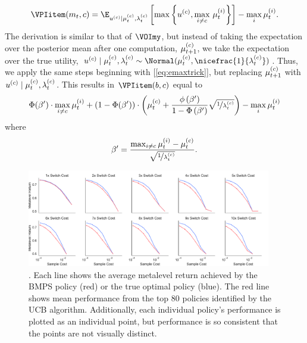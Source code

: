 \begin{equation*}
  \VPIitem(m_t,c)=\E_{u^{(c)} \mid \currentmean, \currentlam} \left[
    \max \left\{ u^{(c)},\max_{i\neq c}\,\mu_t^{(i)} \right\}
  \right] -\max_{i}\mu_t^{(i)}.
\end{equation*}
%
The derivation is similar to that of $\VOImy$, but instead of taking the expectation over the posterior mean after one computation, $\mu_{t+1}^{(c)}$, we take the expectation over the true utility, $u^{(c)} \mid \currentmean, \currentlam \sim \Normal(\currentmean,\nicefrac{1}{\currentlam})$. Thus, we apply the same steps beginning with [\ref{eq:emaxtrick}], but replacing $\mu_{t+1}^{(c)}$ with $u^{(c)} \mid \mu_{t}^{(c)}, \lambda_{t}^{(c)}$. This results in $\VPIitem(b, c)$ equal to
%
%
\begin{equation*}
  \Phi(\beta')\cdot\max_{i\neq c}\mu_t^{(i)}+\left(1-\Phi(\beta')\right)\cdot\left(\mu_{t}^{(c)}+\frac{\phi\left(\beta'\right)}{1-\Phi\left(\beta'\right)}
  \sqrt{\nicefrac{1}{\lambda_{t}^{(c)}}}\right)
  - \max_{i}\mu_t^{(i)}
\end{equation*}
%
where 
%
\begin{equation*}
  \beta'=\frac{\max_{i\neq c}\mu_t^{(i)}-\mu_{t}^{(c)}}{\sqrt{\nicefrac{1}{\lambda_{t}^{(c)}}}}.
\end{equation*}
%


\begin{figure}[b!]
  
  \centering
  \includegraphics[width=0.95\textwidth]{figs/attention/supp-bernoulli.pdf}
  \caption{.
    Each line shows the average metalevel return achieved by the BMPS policy (red) or the true optimal policy (blue). The red line shows mean performance from the top 80 policies identified by the UCB algorithm. Additionally, each individual policy's performance is plotted as an individual point, but performance is so consistent that the points are not visually distinct.}
  \label{fig:attention-bernoulli}
  
\end{figure}  %


